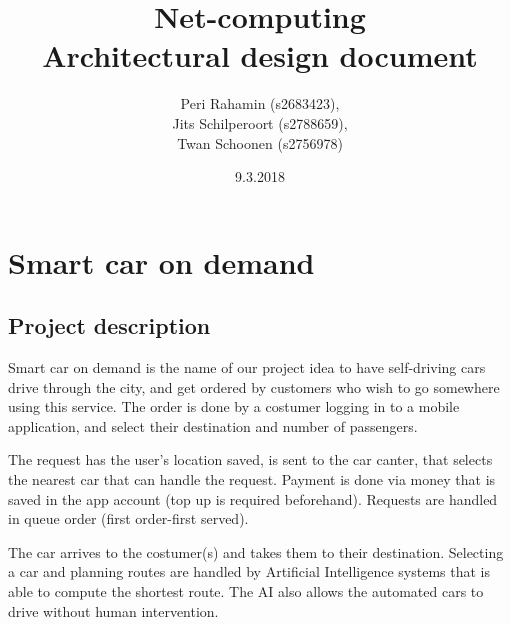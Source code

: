 \documentclass[a4paper]{article}
\begin{document}
\title{Net-computing\\
Architectural design document
}

\date{9.3.2018}

\author{Peri Rahamin (s2683423),\\
Jits Schilperoort (s2788659),\\
Twan Schoonen (s2756978)
}




\maketitle
\section*{Smart car on demand}
\subsection*{Project description}
Smart car on demand is the name of our project idea to have self-driving cars drive through the city, and get ordered by customers who wish to go somewhere using this service. The order is done by a costumer logging in to a mobile application, and select their destination and number of passengers.

The request has the user's location saved, is sent to the car canter, that selects the nearest car that can handle the request. Payment is done via money that is saved in the app account (top up is required beforehand). Requests are handled in queue order (first order-first served).

The car arrives to the costumer(s) and takes them to their destination. Selecting a car and planning routes are handled by Artificial Intelligence systems that is able to compute the shortest route. The AI also allows the automated cars to drive without human intervention.
\end{document}
